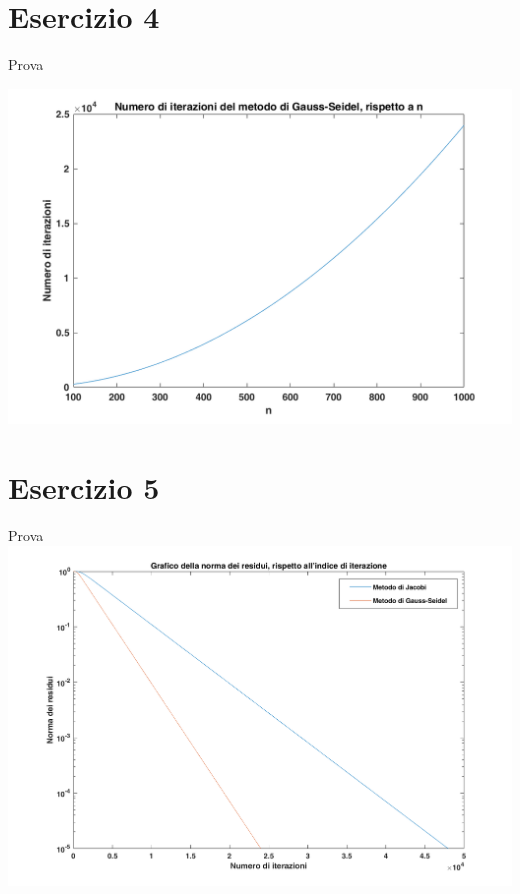 \documentclass[10pt,a4paper]{report}
\begin{document}
		\section{Esercizio 4}
			Prova
			
			\includegraphics[width=\textwidth]{Grafici/Cap6/es4_gs.png}
		\section{Esercizio 5}
			Prova
			\includegraphics[width=\textwidth]{Grafici/Cap6/es5_normeResidui.png}
				
\end{document}
